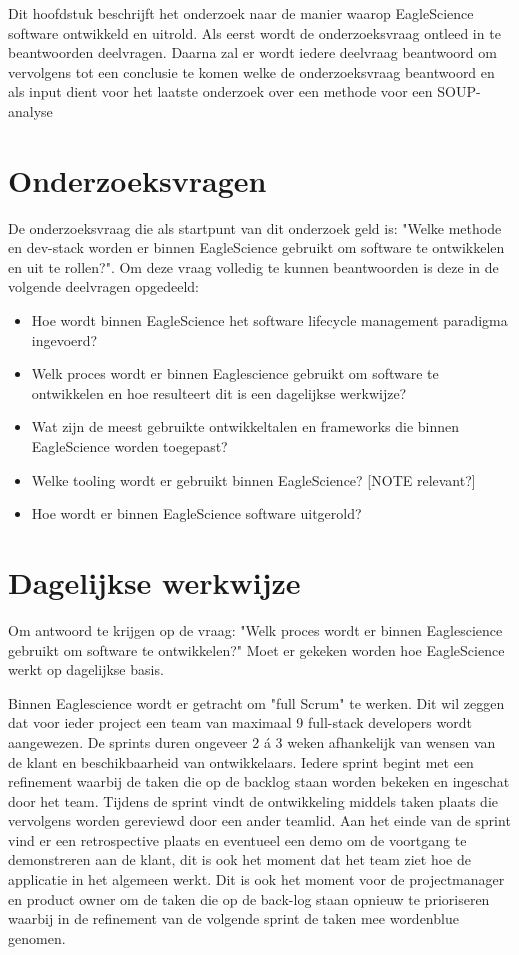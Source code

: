 Dit hoofdstuk beschrijft het onderzoek naar de manier waarop EagleScience software ontwikkeld en uitrold. Als eerst wordt de onderzoeksvraag ontleed in te beantwoorden deelvragen. Daarna zal er wordt iedere deelvraag beantwoord om vervolgens tot een conclusie te komen welke de onderzoeksvraag beantwoord en als input dient voor het laatste onderzoek over een methode voor een SOUP-analyse

\section{Onderzoeksvragen}\label{sec:ESOnderzoeksVraag}
De onderzoeksvraag die als startpunt van dit onderzoek geld is: "Welke methode en dev-stack worden er binnen EagleScience gebruikt om software te ontwikkelen en uit te rollen?". Om deze vraag volledig te kunnen beantwoorden is deze in de volgende deelvragen opgedeeld:
\begin{itemize}
    \item Hoe wordt binnen EagleScience het software lifecycle management paradigma ingevoerd?
    \item Welk proces wordt er binnen Eaglescience gebruikt om software te ontwikkelen en hoe resulteert dit is een dagelijkse werkwijze?
    \item Wat zijn de meest gebruikte ontwikkeltalen en frameworks die binnen EagleScience worden toegepast?
    \item Welke tooling wordt er gebruikt binnen EagleScience? [NOTE relevant?]
    \item Hoe wordt er binnen EagleScience software uitgerold?
\end{itemize}


\section{Dagelijkse werkwijze}\label{sec:dagelijkse-werkwijze}
Om antwoord te krijgen op de vraag: "Welk proces wordt er binnen Eaglescience gebruikt om software te ontwikkelen?" Moet er gekeken worden hoe EagleScience werkt op dagelijkse basis.

Binnen Eaglescience wordt er getracht om "full Scrum" te werken. Dit wil zeggen dat voor ieder project een team van maximaal 9 full-stack developers wordt aangewezen. De sprints duren ongeveer 2 á 3 weken afhankelijk van wensen van de klant en beschikbaarheid van ontwikkelaars. Iedere sprint begint met een refinement waarbij de taken die op de backlog staan worden bekeken en ingeschat door het team. Tijdens de sprint vindt de ontwikkeling middels taken plaats die vervolgens worden gereviewd door een ander teamlid. Aan het einde van de sprint vind er een retrospective plaats en eventueel een demo om de voortgang te demonstreren aan de klant, dit is ook het moment dat het team ziet hoe de applicatie in het algemeen werkt. Dit is ook het moment voor de projectmanager en product owner om de taken die op de back-log staan opnieuw te prioriseren waarbij in de refinement van de volgende sprint de taken mee wordenblue genomen.


